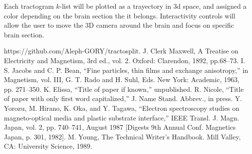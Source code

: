 \documentclass[conference]{IEEEtran}
\begin{document}
Each tractogram $k$-list will be plotted as a trayectory in 3d space, and assigned a color depending on the brain section the it belongs. Interactivity controls will allow the user to move the 3D camera around the brain and focus on specific brain section.

\newpage
%
%
\begin{thebibliography}{00}
    {https://github.com/Aleph-GORY/tractosplit}{}.
     J. Clerk Maxwell, A Treatise on Electricity and Magnetism, 3rd ed., vol. 2. Oxford: Clarendon, 1892, pp.68--73.
     I. S. Jacobs and C. P. Bean, ``Fine particles, thin films and exchange anisotropy,'' in Magnetism, vol. III, G. T. Rado and H. Suhl, Eds. New York: Academic, 1963, pp. 271--350.
     K. Elissa, ``Title of paper if known,'' unpublished.
     R. Nicole, ``Title of paper with only first word capitalized,'' J. Name Stand. Abbrev., in press.
     Y. Yorozu, M. Hirano, K. Oka, and Y. Tagawa, ``Electron spectroscopy studies on magneto-optical media and plastic substrate interface,'' IEEE Transl. J. Magn. Japan, vol. 2, pp. 740--741, August 1987 [Digests 9th Annual Conf. Magnetics Japan, p. 301, 1982].
     M. Young, The Technical Writer's Handbook. Mill Valley, CA: University Science, 1989.
\end{thebibliography}
\end{document}
